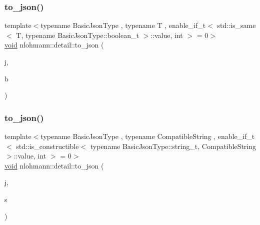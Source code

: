 \subsubsection{\texorpdfstring{to\+\_\+json()}{to\_json()}\hspace{0.1cm}{\footnotesize\ttfamily [1/17]}}
{\footnotesize\ttfamily template$<$typename Basic\+Json\+Type , typename T , enable\+\_\+if\+\_\+t$<$ std\+::is\+\_\+same$<$ T, typename Basic\+Json\+Type\+::boolean\+\_\+t $>$\+::value, int $>$  = 0$>$ \\
\hyperlink{namespacenlohmann_1_1detail_a59fca69799f6b9e366710cb9043aa77d}{void} nlohmann\+::detail\+::to\+\_\+json (\begin{DoxyParamCaption}\item[{Basic\+Json\+Type \&}]{j,  }\item[{T}]{b }\end{DoxyParamCaption})\hspace{0.3cm}{\ttfamily [noexcept]}}

\mbox{\label{namespacenlohmann_1_1detail_a7356ed05cdbbb080cee80e1211e1c6c9}} 
\subsubsection{\texorpdfstring{to\+\_\+json()}{to\_json()}\hspace{0.1cm}{\footnotesize\ttfamily [2/17]}}
{\footnotesize\ttfamily template$<$typename Basic\+Json\+Type , typename Compatible\+String , enable\+\_\+if\+\_\+t$<$ std\+::is\+\_\+constructible$<$ typename Basic\+Json\+Type\+::string\+\_\+t, Compatible\+String $>$\+::value, int $>$  = 0$>$ \\
\hyperlink{namespacenlohmann_1_1detail_a59fca69799f6b9e366710cb9043aa77d}{void} nlohmann\+::detail\+::to\+\_\+json (\begin{DoxyParamCaption}\item[{Basic\+Json\+Type \&}]{j,  }\item[{const Compatible\+String \&}]{s }\end{DoxyParamCaption})}

\mbox{\label{namespacenlohmann_1_1detail_a4aa1ca6b7c61bf19d1f30ea5b669f68e}} 
